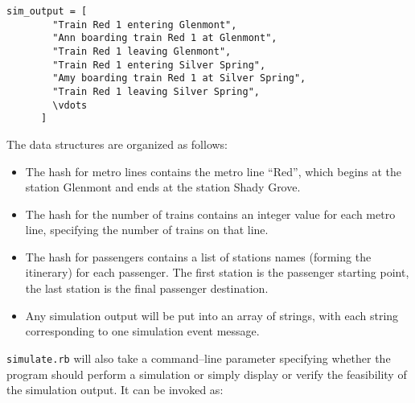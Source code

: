 \documentclass[11pt]{article}
\begin{document}
      \begin{Verbatim}[gobble=6,commandchars=\\\<\>,xleftmargin=22mm]
      sim_output = [
        "Train Red 1 entering Glenmont",
        "Ann boarding train Red 1 at Glenmont",
        "Train Red 1 leaving Glenmont",
        "Train Red 1 entering Silver Spring",
        "Amy boarding train Red 1 at Silver Spring",
        "Train Red 1 leaving Silver Spring",
        \vdots
      ]
      \end{Verbatim}

      \vspace{-2mm}

      The data structures are organized as follows:

      \vspace{-2mm}

      \begin{itemize}

        \addtolength{\itemsep}{-1.5mm}

        \item The hash for metro lines contains the metro line ``Red'', which
              begins at the station Glenmont and ends at the station Shady
              Grove.

        \item The hash for the number of trains contains an integer value for
              each metro line, specifying the number of trains on that line.

        \item The hash for passengers contains a list of stations names
              (forming the itinerary) for each passenger. The first station
              is the passenger starting point, the last station is the final
              passenger destination.

        \item Any simulation output will be put into an array of strings,
              with each string corresponding to one simulation event
              message.

      \end{itemize}

      \vspace{-1.5mm}

      \texttt{simulate.rb} will also take a command--line parameter specifying
    whether the program should perform a simulation or simply display or
    verify the feasibility of the simulation output.  It can be invoked as:
\end{document}
